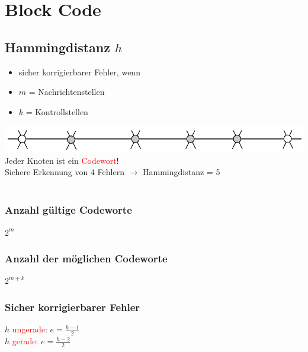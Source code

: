 
\section{Block Code}


\subsection{Hammingdistanz $h$}
\begin{itemize}
    \item sicher korrigierbarer Fehler, wenn
    \item $m$ = Nachrichtenstellen
    \item $k$ = Kontrollstellen
\end{itemize}
\includegraphics[width=\linewidth]{graphic/extern-reto/Hammingdistanz.png}
Jeder Knoten ist ein \textcolor{red}{Codewort}!\\
Sichere Erkennung von 4 Fehlern $\rightarrow$ Hammingdistanz = 5\\\\

\subsubsection{Anzahl gültige Codeworte}
\colorbox{lightlightgrey}{$2^m$}

\subsubsection{Anzahl der möglichen Codeworte}
\colorbox{lightlightgrey}{$2^{m+k}$}

\subsubsection{Sicher korrigierbarer Fehler}
$h$ \textcolor{red}{ungerade}: \colorbox{lightlightgrey}{$e = \frac{h - 1}{2}$}\hspace{3cm}\\
$h$ \textcolor{red}{gerade}: \colorbox{lightlightgrey}{$e = \frac{h - 2}{2}$}

